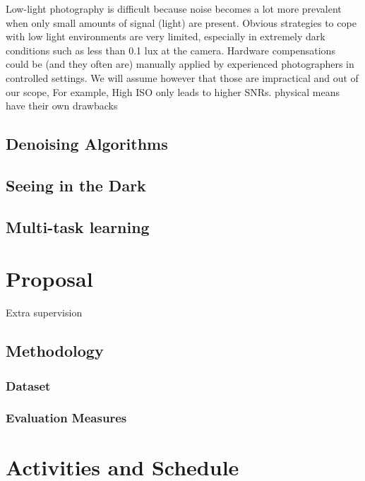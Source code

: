 Low-light photography is difficult because noise becomes a lot more prevalent when only small amounts of signal (light) are present.
Obvious strategies to cope with low light environments are very limited, especially in extremely dark conditions such as less than 0.1 lux at the camera.
Hardware compensations could be (and they often are) manually applied by experienced photographers in controlled settings.
We will assume however that those are impractical and out of our scope, 
For example, 
High ISO only leads to higher SNRs.
physical means have their own drawbacks

\section{Denoising Algorithms}

\section{Seeing in the Dark}

\section{Multi-task learning}


\chapter{\label{chap:proposal}Proposal}

Extra supervision

\section{Methodology}

\subsection{Dataset}

\subsection{Evaluation Measures}


\chapter{\label{chap:activ_sched}Activities and Schedule}
